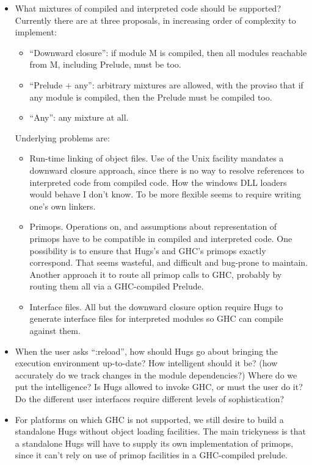\begin{itemize}
\item 
  What mixtures of compiled and interpreted code should be supported?
  Currently there are at three proposals, in increasing order of
  complexity to implement:
  \begin{itemize}
  \item ``Downward closure'': if module M is compiled, then all modules
     reachable from M, including Prelude, must be too.
  \item ``Prelude + any'': arbitrary mixtures are allowed, with the proviso
     that if any module is compiled, then the Prelude must be compiled
     too.
  \item ``Any'': any mixture at all.
  \end{itemize}
  Underlying problems are:
  \begin{itemize}
  \item 
     Run-time linking of object files.  Use of the Unix 
     facility mandates a downward closure approach, since there is
     no way to resolve references to interpreted code from compiled
     code.  How the windows DLL loaders would behave I don't know.
     To be more flexible seems to require writing one's own linkers.
  \item
     Primops.  Operations on, and assumptions about representation of
     primops have to be compatible in compiled and interpreted code.
     One possibility is to ensure that Hugs's and GHC's primops
     exactly correspond.  That seems wasteful, and difficult and
     bug-prone to maintain.  Another approach it to route all
     primop calls to GHC, probably by routing them all via a
     GHC-compiled Prelude.
  \item
     Interface files.  All but the downward closure option require
     Hugs to generate interface files for interpreted modules
     so GHC can compile against them.
  \end{itemize}

\item
  When the user asks ``:reload'', how should Hugs go about bringing
  the execution environment up-to-date?  How intelligent should it be?
  (how accurately do we track changes in the module dependencies?)
  Where do we put the intelligence?  Is Hugs allowed to invoke GHC,
  or must the user do it?  Do the different user interfaces require
  different levels of sophistication?

\item
  For platforms on which GHC is not supported, 
  we still desire to build a standalone Hugs without object loading
  facilities.
  The main trickyness is that a standalone Hugs will have to supply 
  its own implementation of primops, since it can't rely on use of
  primop facilities in a GHC-compiled prelude.
\end{itemize}

